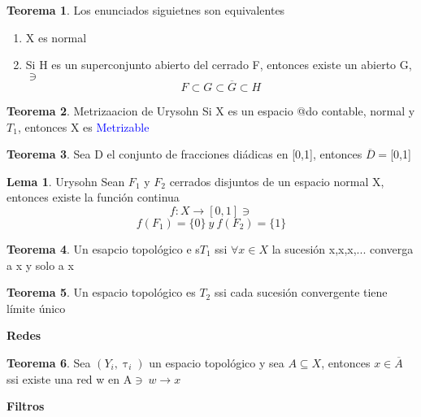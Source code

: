 \documentclass{article}
\theoremstyle{definition}
\newtheorem{theorem}{Teorema}[section]
\newtheorem{lemma}{Lema}[section]
\begin{document}

\begin{theorem}

	Los enunciados siguietnes son equivalentes
	\begin{enumerate}
		\item X es normal
		\item Si H es un superconjunto abierto del cerrado F, entonces existe un abierto G, $\ni$
		\[F\subset G\subset \overline{G}\subset H\]
	\end{enumerate}
\end{theorem}


\begin{theorem}{Metrizaacion de Urysohn}
	Si X es un espacio @do contable, normal y $T_1$, entonces X es \textcolor{blue}{Metrizable}
\end{theorem}


\begin{theorem}
	Sea D el conjunto de fracciones diádicas en [0,1], entonces $\overline{D}=$[0,1]
\end{theorem}


\begin{lemma}{Urysohn}
	Sean $F_1$ y $F_2$ cerrados disjuntos de un espacio normal X, entonces existe la función continua 
	\[f:X\to[0,1]\ni\]
	\[f(F_1)=\{0\}\ y \ f(F_2)=\{1\}\]
\end{lemma}


\begin{theorem}
	Un esapcio topológico e s$T_1$ ssi $\forall x\in X$ la sucesión x,x,x,... converga a x y solo a x
\end{theorem}


\begin{theorem}
	Un espacio topológico es $T_2$ ssi cada sucesión convergente tiene límite único
\end{theorem}
\textbf{Redes}


\begin{theorem}
	Sea $(Y_i,\uptau_i)$ un espacio topológico y sea $A\subseteq X$, entonces $x\in \overline{A}$ ssi existe una red w en A$\ni\ w\to x$
\end{theorem}
\textbf{Filtros}

\end{document}
